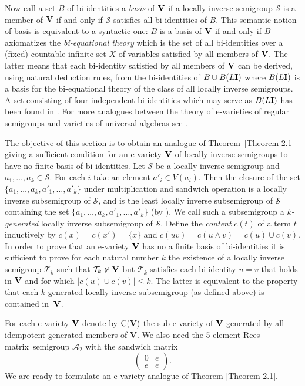 \documentclass[11pt,reqno]{amsart}
\numberwithin{equation}{section}
\theoremstyle{remark}
\def\pv#1{{\bf #1}}
\def\Vc{\mathbf{V}}
\def\we{\wedge}
\def\Co{{\mathrm C}}
\def\Rm{Rees matrix}
\begin{document}
Now call a set $B$ of bi-identities a \emph{basis} of $\pv V$ if
 a locally inverse semigroup $\mathcal S$ is a member
of $\pv V$ if and only if $\mathcal S$ satisfies all bi-identities
of $B$. This semantic notion of basis is equivalent to a syntactic
one: $B$ is a basis of  $\pv V$ if and only if $B$ axiomatizes the
\emph{bi-equational theory} which is the set of all bi-identities
over a (fixed) countable infinite set $X$ of variables satisfied
by all members of $\pv V$. The latter means that  each bi-identity
satisfied by all members of $\pv V$ can be derived, using natural
deduction rules, from the bi-identities of $B\cup B(L\pv I)$ where
$B(L\pv I)$ is a basis for the bi-equational theory of the class
of all locally inverse semigroups. A set consisting of four
independent bi-identities which may serve as $B(L\pv I)$ has been
found in \cite{A3}. For more analogues between the theory of
e-varieties of regular semigroups and varieties of universal
algebras see \cite{A2,A3,KS,Y1}.

The objective of this section is to obtain an analogue of
Theorem~\ref{Theorem 2.1} giving a sufficient condition for an
e-variety $\pv V$ of locally inverse semigroups to have no finite
basis of bi-identities. Let $\mathcal S$ be a locally inverse
semigroup and $a_1,\dots,a_k\in \mathcal S$. For each $i$ take an
element $a'_i\in V(a_i)$. Then the closure of the set
$\{a_1,\dots,a_k,a'_1,\dots,a'_k\}$ under multiplication and
sandwich operation  is a locally inverse subsemigroup of $\mathcal
S$, and is the least locally inverse subsemigroup of $\mathcal S$
containing the set $\{a_1,\dots,a_k,a'_1,\dots,a'_k\}$ (by
\cite{Y1}). We call such a subsemigroup a {\it $k$-generated}
locally inverse subsemigroup of $\mathcal S$. Define the {\it
content} $c(t)$ of a term $t$ inductively by $c(x)=c(x')=\{x\}$
and $c(uv)=c(u\we v)=c(u)\cup c(v)$. In order to prove that an
e-variety $\pv V$ has no a finite basis of bi-identities it is
sufficient to prove for each natural number $k$ the existence of a
locally inverse semigroup $\mathcal{T}_k$ such that
$\mathcal{T}_k\not\in \pv V$ but $\mathcal{T}_k$ satisfies each
bi-identity $u=v$ that holds in $\pv V$ and for which $\vert
c(u)\cup c(v)\vert \le k$. The latter is equivalent to the
property that each $k$-generated locally inverse subsemigroup (as
defined above) is contained in~$\pv V$.

For each e-variety $\pv V$ denote by $\Co(\pv V)$ the
sub-e-variety of $\pv V$ generated by all idempotent generated
members of $\Vc$. We also need the 5-element \Rm\ semigroup
$\mathcal{A}_2$ with the sandwich matrix
\begin{equation}
\label{matrix for TA}
\begin{pmatrix}
0 & e\\
e & e
\end{pmatrix}.
\end{equation} We
are ready to formulate an e-variety analogue of Theorem
\ref{Theorem 2.1}.
\end{document}
